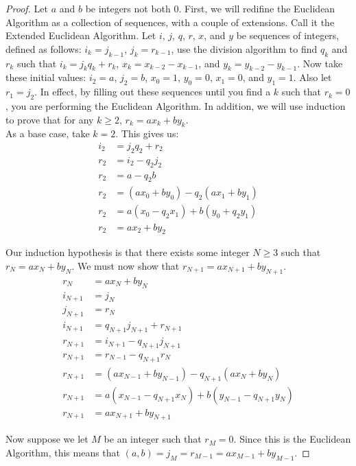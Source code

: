 \documentclass[12pt,leqno]{article}
\numberwithin{equation}{section}
\theoremstyle{definition}
\begin{document}
\begin{proof}[Proof]
Let $a$ and $b$ be integers not both $0$.  First, we will redifine the Euclidean Algorithm as a collection of sequences, with a couple of extensions.  Call it the Extended Euclidean Algorithm.  Let $i$, $j$, $q$, $r$, $x$, and $y$ be sequences of integers, defined as follows: $i_k = j_{k-1}$, $j_k = r_{k-1}$, use the division algorithm to find $q_k$ and $r_k$ such that $i_k = j_kq_k + r_k$, $x_k = x_{k-2} - x_{k-1}$, and $y_k = y_{k-2} - y_{k-1}$.  Now take these initial values: $i_2 = a$, $j_2 = b$, $x_0 = 1$, $y_0 = 0$, $x_1 = 0$, and $y_1 = 1$.  Also let $r_1 = j_2$.  In effect, by filling out these sequences until you find a $k$ such that $r_k = 0$, you are performing the Euclidean Algorithm.  In addition, we will use induction to prove that for any $k \geq 2$, $r_k = ax_k + by_k$.\\

As a base case, take $k = 2$.  This gives us:
\begin{align*}
i_2 &= j_2q_2 + r_2\\
r_2 &= i_2 - q_2j_2\\
r_2 &= a - q_2b\\
r_2 &= (ax_0 + by_0) - q_2(ax_1 + by_1)\\
r_2 &= a(x_0 - q_2x_1) + b(y_0 + q_2y_1)\\
r_2 &= ax_2 + by_2
\end{align*}

Our induction hypothesis is that there exists some integer $N \geq 3$ such that $r_N = ax_N + by_N$.  We must now show that $r_{N+1} = ax_{N+1} + by_{N+1}$.
\begin{align*}
r_N &= ax_N + by_N\\
i_{N+1} &= j_N\\
j_{N+1} &= r_N\\
i_{N+1} &= q_{N+1}j_{N+1} + r_{N+1}\\
r_{N+1} &= i_{N+1} - q_{N+1}j_{N+1}\\
r_{N+1} &= r_{N-1} - q_{N+1}r_N\\
r_{N+1} &= (ax_{N-1} + by_{N-1}) - q_{N+1}(ax_N + by_N)\\
r_{N+1} &= a(x_{N-1} - q_{N+1}x_N) + b(y_{N-1} - q_{N+1}y_N)\\
r_{N+1} &= ax_{N+1} + by_{N+1}
\end{align*}

Now suppose we let $M$ be an integer such that $r_M = 0$.  Since this is the Euclidean Algorithm, this means that $(a, b) = j_M = r_{M-1} = ax_{M-1} + by_{M-1}$.
\end{proof}
\end{document}

